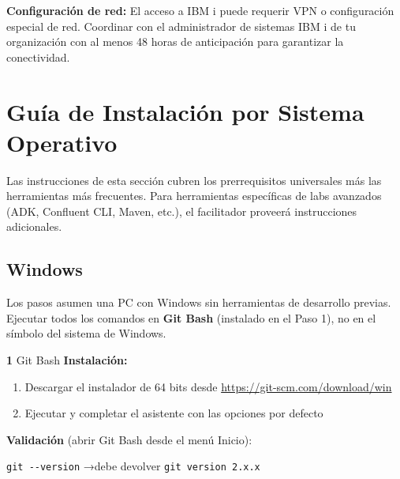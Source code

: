 \documentclass[11pt, a4paper]{article}
\newcommand{\version}[1]{\texttt{\textcolor{ibmblue}{#1}}}
\newcommand{\cmd}[1]{\texttt{\textcolor{ibmdark}{\small #1}}}
\newcommand{\checkmark}{\textcolor{ibmgreen}{\faCheckCircle}}
\begin{document}
\vspace{10pt}
\begin{warningbox}
  \textbf{Configuración de red:} El acceso a IBM i puede requerir VPN o configuración especial de red. Coordinar con el administrador de sistemas IBM i de tu organización con al menos 48 horas de anticipación para garantizar la conectividad.
\end{warningbox}

\section{Guía de Instalación por Sistema Operativo}
\label{sec:guia-instalacion}

Las instrucciones de esta sección cubren los prerrequisitos universales más las herramientas más frecuentes. Para herramientas específicas de labs avanzados (ADK, Confluent CLI, Maven, etc.), el facilitador proveerá instrucciones adicionales.

\subsection{Windows}
\label{sec:windows}

Los pasos asumen una PC con Windows sin herramientas de desarrollo previas. Ejecutar todos los comandos en \textbf{Git Bash} (instalado en el Paso 1), no en el símbolo del sistema de Windows.

\vspace{8pt}
\begin{labbox}[ibmdark]{\textbf{1} \quad Git Bash}
\textbf{Instalación:}
\begin{enumerate}[leftmargin=*, nosep]
  \item Descargar el instalador de 64 bits desde \url{https://git-scm.com/download/win}
  \item Ejecutar y completar el asistente con las opciones por defecto
\end{enumerate}
\vspace{4pt}
\textbf{Validación} (abrir Git Bash desde el menú Inicio):
\begin{center}
  \cmd{git -{}-version} \quad→\quad debe devolver \version{git version 2.x.x} \checkmark
\end{center}
\end{labbox}
\end{document}
